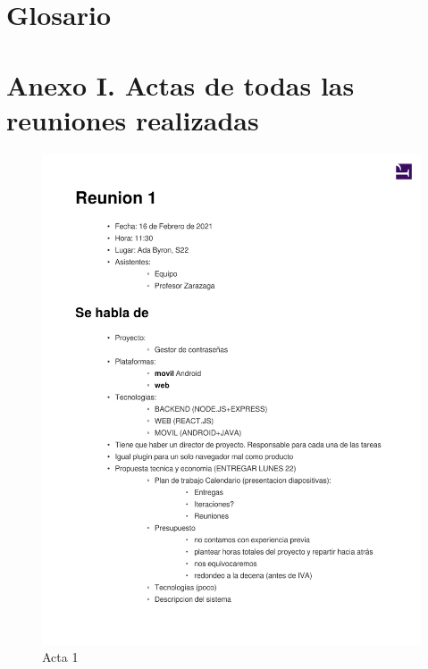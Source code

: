 \documentclass{article}
\begin{document}
\section*{Glosario}
 
\section*{Anexo I. Actas de todas las reuniones realizadas}
\begin{figure}
   \includegraphics[width=.8\textwidth]{../../actas_reuniones/acta1.pdf}
   \caption{Acta 1}
\end{figure}
\end{document}

